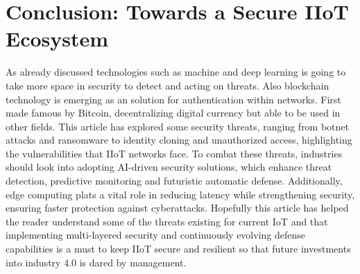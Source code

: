 \documentclass[article,a4paper]{IEEEtran}
\begin{document}
\section{Conclusion: Towards a Secure IIoT Ecosystem}
As already discussed technologies such as machine and deep learning is going to take more space in security to detect and acting on threats. Also blockchain technology is emerging as an solution for authentication within networks. First made famous by Bitcoin, decentralizing digital currency but able to be used in other fields. This article has explored some security threats, ranging from botnet attacks and ransomware to identity cloning and unauthorized access, highlighting the vulnerabilities that IIoT networks face. 
\newline\newline
To combat these threats, industries should look into adopting AI-driven security solutions, which enhance threat detection, predictive monitoring and futuristic automatic defense. Additionally, edge computing plats a vital role in reducing latency while strengthening security, ensuring faster protection against cyberattacks. 
\newline\newline
Hopefully this article has helped the reader understand some of the threats existing for current IoT and that implementing multi-layered security and continuously evolving defense capabilities is a must to keep IIoT secure and resilient so that future investments into industry 4.0 is dared by management.  
\printbibliography
\end{document}
